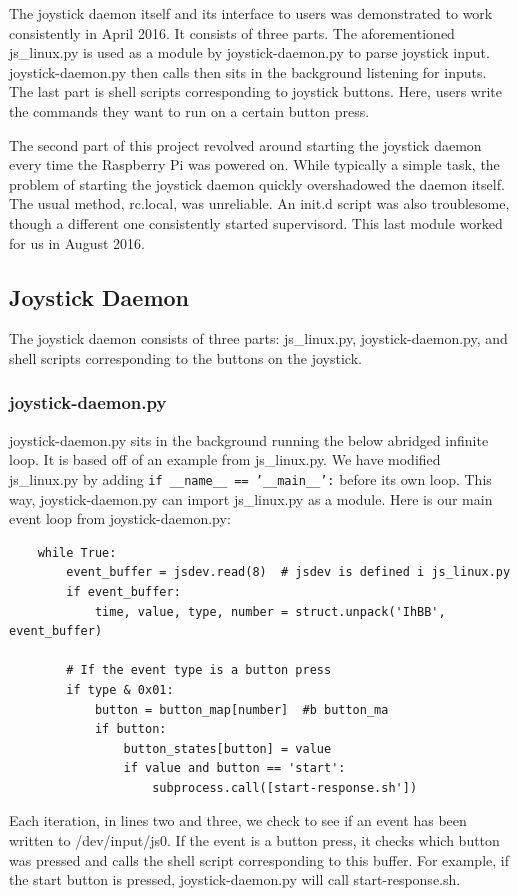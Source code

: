 \documentclass[titlepage]{article}
\begin{document}
The joystick daemon itself and its interface to users was demonstrated to work consistently in April 2016.
It consists of three parts. The aforementioned js\_linux.py is used as a module by joystick-daemon.py to parse joystick input. joystick-daemon.py then calls then sits in the background listening for inputs. The last part is shell scripts corresponding to joystick buttons. Here, users write the commands they want to run on a certain button press. 

The second part of this project revolved around starting the joystick daemon every time the Raspberry Pi was powered on. While typically a simple task, the problem of starting the joystick daemon quickly overshadowed the daemon itself. The usual method, rc.local, was unreliable. An init.d script was also troublesome, though a different one consistently started supervisord. This last module worked for us in August 2016.

\subsection{Joystick Daemon}
The joystick daemon consists of three parts: js\_linux.py, joystick-daemon.py, and shell scripts corresponding to the buttons on the joystick.  
\subsubsection{joystick-daemon.py}
joystick-daemon.py sits in the background running the below abridged infinite loop. It is based off of an example from js\_linux.py. We have modified js\_linux.py by adding \texttt{if \_\_name\_\_ == '\_\_main\_\_':} before its own loop. This way, joystick-daemon.py can import js\_linux.py as a module. Here is our main event loop from joystick-daemon.py:
\begin{lstlisting}
    while True:
        event_buffer = jsdev.read(8)  # jsdev is defined i js_linux.py
        if event_buffer:
            time, value, type, number = struct.unpack('IhBB', event_buffer)

        # If the event type is a button press 
        if type & 0x01:
            button = button_map[number]  #b button_ma
            if button:
                button_states[button] = value
                if value and button == 'start':
                    subprocess.call([start-response.sh'])
\end{lstlisting}
Each iteration, in lines two and three, we check to see if an event has been written to /dev/input/js0. If the event is a button press, it checks which button was pressed and calls the shell script corresponding to this buffer. For example, if the start button is pressed, joystick-daemon.py will call start-response.sh.
\end{document}
